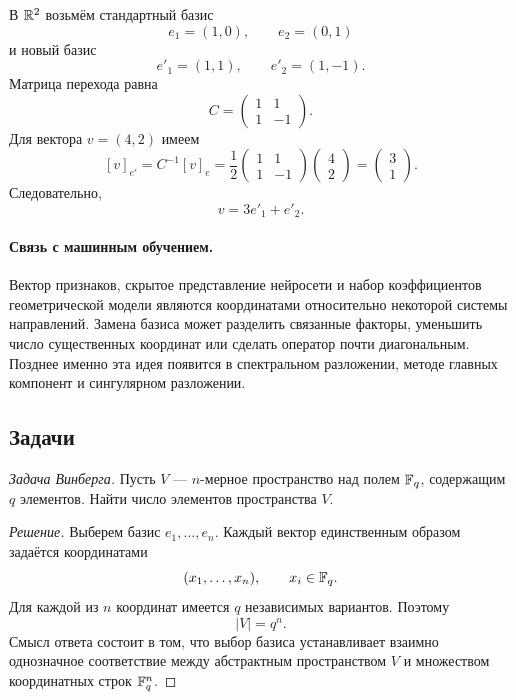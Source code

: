 \begin{example}
В \(\mathbb{R}^2\) возьмём стандартный базис
\[
e_1=(1,0),
\qquad
e_2=(0,1)
\]
и новый базис
\[
e'_1=(1,1),
\qquad
e'_2=(1,-1).
\]
Матрица перехода равна
\[
C=
\begin{pmatrix}
1&1\\
1&-1
\end{pmatrix}.
\]
Для вектора \(v=(4,2)\) имеем
\[
[v]_{e'}=C^{-1}[v]_e
=
\frac12
\begin{pmatrix}
1&1\\
1&-1
\end{pmatrix}
\begin{pmatrix}
4\\2
\end{pmatrix}
=
\begin{pmatrix}
3\\1
\end{pmatrix}.
\]
Следовательно,
\[
v=3e'_1+e'_2.
\]
\end{example}

\paragraph{Связь с машинным обучением.}

Вектор признаков, скрытое представление нейросети и набор коэффициентов геометрической модели являются координатами относительно некоторой системы направлений. Замена базиса может разделить связанные факторы, уменьшить число существенных координат или сделать оператор почти диагональным. Позднее именно эта идея появится в спектральном разложении, методе главных компонент и сингулярном разложении.

\subsection*{Задачи}

\begin{problem}
\textit{Задача Винберга.}
Пусть \(V\) --- \(n\)-мерное пространство над полем \(\mathbb{F}_q\), содержащим \(q\) элементов. Найти число элементов пространства \(V\).
\end{problem}

\begin{proof}[Решение]
Выберем базис \(e_1,\dots,e_n\). Каждый вектор единственным образом задаётся координатами
\[
(x_1,\dots,x_n),
\qquad x_i\in\mathbb{F}_q.
\]
Для каждой из \(n\) координат имеется \(q\) независимых вариантов. Поэтому
\[
|V|=q^n.
\]
Смысл ответа состоит в том, что выбор базиса устанавливает взаимно однозначное соответствие между абстрактным пространством \(V\) и множеством координатных строк \(\mathbb{F}_q^n\).
\end{proof}

